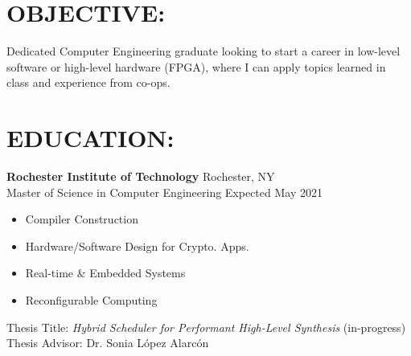 \documentclass[line,margin]{res}
\newcommand{\SECTIONOFFSET}{-3.6pt}
\newcommand{\ITEMOFFSET}{-8pt}
\begin{document}
\setlength\columnsep{-30pt}
\email{} %
\phone{} %
\address{} %
\address{} %
\website{} %

\begin{resume}
	 \setlength
	 \multicolsep{2pt}

    \vspace{-10pt} %

	\section{OBJECTIVE:} %
		Dedicated Computer Engineering graduate looking to start a career in low-level software or high-level hardware (FPGA), where I can apply topics learned in class and experience from co-ops.

		\vspace{\SECTIONOFFSET}

	\section{EDUCATION:} 
		
		\textbf{Rochester Institute of Technology} \hfill Rochester, NY\\
		Master of Science in Computer Engineering \hfill Expected May 2021

		\begin{multicols}{2}
			\setlength\columnsep{1pt}
			\begin{itemize}
				\setlength{\itemindent}{-10pt}
				\item[] Compiler Construction
				\item[] Hardware/Software Design for Crypto. Apps.
				\item[] \hspace{16pt} Real-time \& Embedded Systems
				\item[] \hspace{16pt} Reconfigurable Computing
			\end{itemize}
		\end{multicols}

		\vspace{-12pt}
		Thesis Title: \textit{Hybrid Scheduler for Performant High-Level Synthesis} (in-progress) \\
		Thesis Advisor: Dr. Sonia L\'opez Alarc\'on 
		\vspace{\ITEMOFFSET}


\end{resume}
\end{document}
